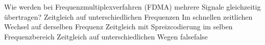     {Wie werden bei Frequenzmultiplexverfahren (FDMA) mehrere Signale gleichzeitig übertragen?}
    {Zeitgleich auf unterschiedlichen Frequenzen}
    {Im schnellen zeitlichen Wechsel auf derselben Frequenz}
    {Zeitgleich mit Spreizcodierung im selben Frequenzbereich}
    {Zeitgleich auf unterschiedlichen Wegen}
    {false}{false}